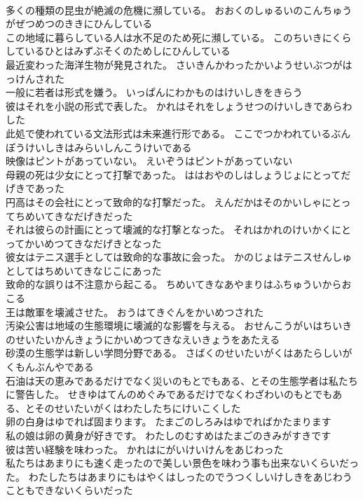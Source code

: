 \documentclass[8pt]{extreport}
\begin{document}
\begin{CJK}{UTF8}{min}
\\	多くの種類の昆虫が絶滅の危機に瀕している。	おおくのしゅるいのこんちゅうがぜつめつのききにひんしている 
\\	この地域に暮らしている人は水不足のため死に瀕している。	このちいきにくらしているひとはみずぶそくのためしにひんしている 
\\	最近変わった海洋生物が発見された。	さいきんかわったかいようせいぶつがはっけんされた 
\\	一般に若者は形式を嫌う。	いっぱんにわかものはけいしきをきらう 
\\	彼はそれを小説の形式で表した。	かれはそれをしょうせつのけいしきであらわした 
\\	此処で使われている文法形式は未来進行形である。	ここでつかわれているぶんぽうけいしきはみらいしんこうけいである 
\\	映像はピントがあっていない。	えいぞうはピントがあっていない 
\\	母親の死は少女にとって打撃であった。	ははおやのしはしょうじょにとってだげきであった 
\\	円高はその会社にとって致命的な打撃だった。	えんだかはそのかいしゃにとってちめいてきなだげきだった 
\\	それは彼らの計画にとって壊滅的な打撃となった。	それはかれのけいかくにとってかいめつてきなだげきとなった 
\\	彼女はテニス選手としては致命的な事故に会った。	かのじょはテニスせんしゅとしてはちめいてきなじこにあった 
\\	致命的な誤りは不注意から起こる。	ちめいてきなあやまりはふちゅういからおこる 
\\	王は敵軍を壊滅させた。	おうはてきぐんをかいめつされた 
\\	汚染公害は地域の生態環境に壊滅的な影響を与える。	おせんこうがいはちいきのせいたいかんきょうにかいめつてきなえいきょうをあたえる 
\\	砂漠の生態学は新しい学問分野である。	さばくのせいたいがくはあたらしいがくもんぶんやである 
\\	石油は天の恵みであるだけでなく災いのもとでもある、とその生態学者は私たちに警告した。	せきゆはてんのめぐみであるだけでなくわざわいのもとでもある、とそのせいたいがくはわたしたちにけいこくした 
\\	卵の白身はゆでれば固まります。	たまごのしろみはゆでればかたまります 
\\	私の娘は卵の黄身が好きです。	わたしのむすめはたまごのきみがすきです 
\\	彼は苦い経験を味わった。	かれはにがいけいけんをあじわった 
\\	私たちはあまりにも速く走ったので美しい景色を味わう事も出来ないくらいだった。	わたしたちはあまりにもはやくはしったのでうつくしいけしきをあじわうこともできないくらいだった 

\end{CJK}
\end{document}

